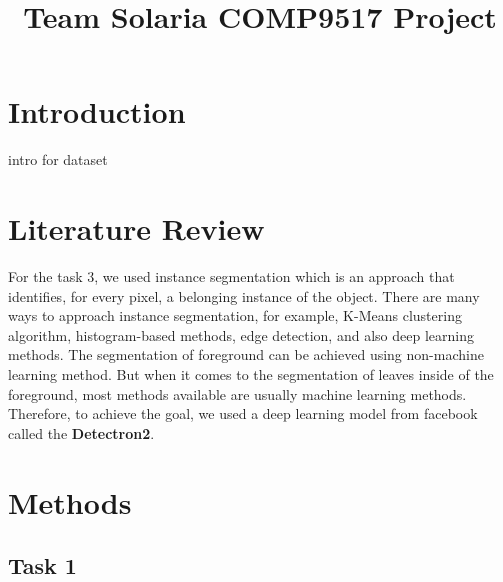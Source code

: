\documentclass[conference]{IEEEtran}
\begin{document}
%
\title{Team Solaria COMP9517 Project}


\author{
\and
{}
\IEEEauthorblockA{}
\and
{}
}


\maketitle
\IEEEpeerreviewmaketitle



\section{Introduction}
intro for dataset


\section{Literature Review}

For the task 3, we used instance segmentation \cite{Hafiz_2020} which is an approach that identifies, for every pixel, a belonging instance of the object.
There are many ways to approach instance segmentation, for example, K-Means clustering algorithm, histogram-based methods, edge detection, and also deep learning methods. The segmentation of foreground can be achieved using non-machine learning method. But when it comes to the segmentation of leaves inside of the foreground, most methods available are usually machine learning methods. Therefore, to achieve the goal, we used a deep learning model from facebook called the \textbf{Detectron2}. 

\section{Methods}

\subsection{Task 1}
\end{document}
